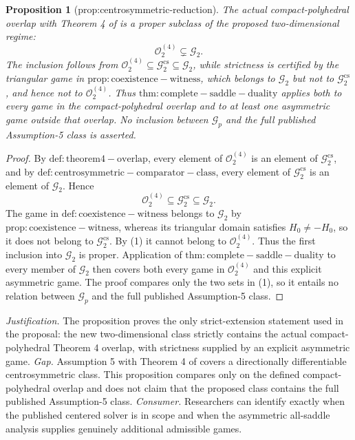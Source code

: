 \documentclass{article}
\newtheorem{proposition}{Proposition}
\begin{document}
\begin{proposition}[prop:centrosymmetric-reduction]\label{prop:centrosymmetric-reduction}
The actual compact-polyhedral overlap with Theorem 4 of \cite{MontielOleaQiuStoye2026Local} is a proper subclass of the proposed two-dimensional regime:
\[
\mathcal O_2^{(4)}\subsetneq\mathcal G_2.
\]
The inclusion follows from \(\mathcal O_2^{(4)}\subseteq\mathcal G_2^{\mathrm{cs}}\subseteq\mathcal G_2\), while strictness is certified by the triangular game in \(\mathrm{prop:coexistence-witness}\), which belongs to \(\mathcal G_2\) but not to \(\mathcal G_2^{\mathrm{cs}}\), and hence not to \(\mathcal O_2^{(4)}\). Thus \(\mathrm{thm:complete-saddle-duality}\) applies both to every game in the compact-polyhedral overlap and to at least one asymmetric game outside that overlap. No inclusion between \(\mathcal G_p\) and the full published Assumption-5 class is asserted.
\end{proposition}
\begin{proof}
By \(\mathrm{def:theorem4-overlap}\), every element of \(\mathcal O_2^{(4)}\) is an element of \(\mathcal G_2^{\mathrm{cs}}\), and by \(\mathrm{def:centrosymmetric-comparator-class}\), every element of \(\mathcal G_2^{\mathrm{cs}}\) is an element of \(\mathcal G_2\). Hence
\[
 \mathcal O_2^{(4)}\subseteq\mathcal G_2^{\mathrm{cs}}\subseteq\mathcal G_2. \tag{1}
\]
The game in \(\mathrm{def:coexistence-witness}\) belongs to \(\mathcal G_2\) by \(\mathrm{prop:coexistence-witness}\), whereas its triangular domain satisfies \(H_0\neq-H_0\), so it does not belong to \(\mathcal G_2^{\mathrm{cs}}\). By (1) it cannot belong to \(\mathcal O_2^{(4)}\). Thus the first inclusion into \(\mathcal G_2\) is proper. Application of \(\mathrm{thm:complete-saddle-duality}\) to every member of \(\mathcal G_2\) then covers both every game in \(\mathcal O_2^{(4)}\) and this explicit asymmetric game. The proof compares only the two sets in (1), so it entails no relation between \(\mathcal G_p\) and the full published Assumption-5 class.
\end{proof}
\par\smallskip\noindent \textit{Justification.} The proposition proves the only strict-extension statement used in the proposal: the new two-dimensional class strictly contains the actual compact-polyhedral Theorem 4 overlap, with strictness supplied by an explicit asymmetric game. \textit{Gap.} Assumption 5 with Theorem 4 of \cite{MontielOleaQiuStoye2026Local} covers a directionally differentiable centrosymmetric class. This proposition compares only on the defined compact-polyhedral overlap and does not claim that the proposed class contains the full published Assumption-5 class. \textit{Consumer.} Researchers can identify exactly when the published centered solver is in scope and when the asymmetric all-saddle analysis supplies genuinely additional admissible games.
\end{document}
